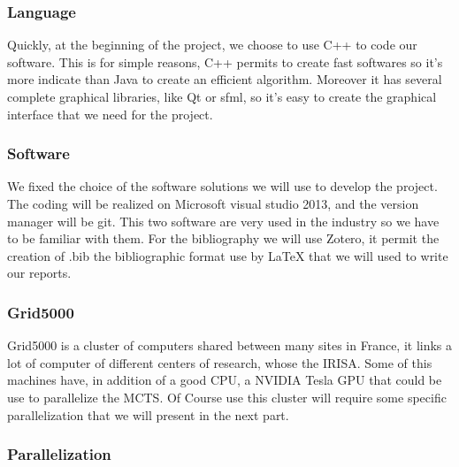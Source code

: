 \subsubsection{Language}
	Quickly, at the beginning of the project, we choose to use C++ to code our software. This is for simple reasons, C++ permits to create fast softwares so it's more indicate than Java to create an efficient algorithm.  Moreover it has several complete graphical libraries, like Qt or sfml, so it's easy to create the graphical interface that we need for the project.

\subsubsection{Software}
	We fixed the choice of the software solutions we will use to develop the project. The coding  will be realized on Microsoft visual studio 2013, and the version manager will be git. This two software are very used in the industry so we have to be familiar with them.
For the bibliography we will use Zotero, it permit the creation of .bib the bibliographic format use by LaTeX that we will used to write our reports.

\subsubsection{Grid5000}
	Grid5000 is a cluster of computers shared between many sites in France, it links a lot of computer of different centers of research, whose the IRISA. Some of this machines have, in addition of a good CPU, a NVIDIA Tesla GPU that could be use to parallelize the MCTS. Of Course use this cluster will require some specific parallelization that we will present in the next part.

\subsubsection{Parallelization}

